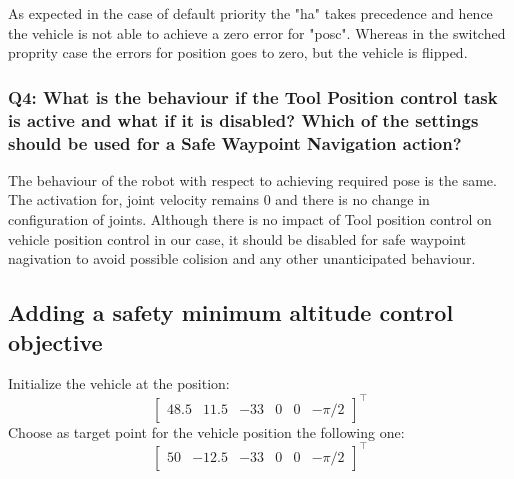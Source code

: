 \documentclass{article}
\begin{document}
As expected in the case of default priority the "ha" takes precedence and hence the vehicle is not able to achieve a zero error for "posc". Whereas in the switched proprity case the errors for position goes to zero, but the vehicle is flipped. 

\subsubsection{Q4: What is the behaviour if the Tool Position control task is active and what if it is disabled? Which of the settings should be used for a Safe Waypoint Navigation action?}

The behaviour of the robot with respect to achieving required pose is the same. The activation for, joint velocity remains 0 and there is no change in configuration of joints. Although there is no impact of Tool position control on vehicle position control in our case, it should be disabled for safe waypoint nagivation to avoid possible colision and any other unanticipated behaviour.




\subsection{Adding a safety minimum altitude control objective}
Initialize the vehicle at the position:
\begin{displaymath}
\begin{bmatrix} 48.5 & 11.5 & -33 & 0 & 0 &-\pi/2\end{bmatrix}^\top
\end{displaymath} 
Choose as target point for the vehicle position the following one:
\begin{displaymath}
\begin{bmatrix} 50 & -12.5 & -33 & 0 & 0 & -\pi/2 \end{bmatrix}^\top
\end{displaymath}
\end{document}

